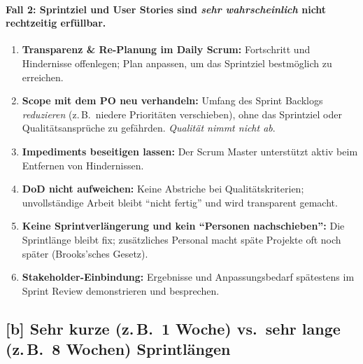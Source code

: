 \documentclass[12pt]{article}
\begin{document}
\paragraph{Fall 2: Sprintziel und User Stories sind \emph{sehr wahrscheinlich} nicht rechtzeitig erfüllbar.}
\begin{enumerate}
  \item \textbf{Transparenz \& Re-Planung im Daily Scrum:} Fortschritt und Hindernisse offenlegen; Plan anpassen, um das Sprintziel bestmöglich zu erreichen.
  \item \textbf{Scope mit dem PO neu verhandeln:} Umfang des Sprint Backlogs \emph{reduzieren} (z.\,B.\ niedere Prioritäten verschieben), ohne das Sprintziel oder Qualitätsansprüche zu gefährden. \emph{Qualität nimmt nicht ab}.
  \item \textbf{Impediments beseitigen lassen:} Der Scrum Master unterstützt aktiv beim Entfernen von Hindernissen.
  \item \textbf{DoD nicht aufweichen:} Keine Abstriche bei Qualitätskriterien; unvollständige Arbeit bleibt \enquote{nicht fertig} und wird transparent gemacht.
  \item \textbf{Keine Sprintverlängerung und kein \enquote{Personen nachschieben}:} Die Sprintlänge bleibt fix; zusätzliches Personal macht späte Projekte oft noch später (Brooks’sches Gesetz).
  \item \textbf{Stakeholder-Einbindung:} Ergebnisse und Anpassungsbedarf spätestens im Sprint Review demonstrieren und besprechen.
\end{enumerate}

\newpage
\subsection*{[b] Sehr kurze (z.\,B.\ 1 Woche) vs.\ sehr lange (z.\,B.\ 8 Wochen) Sprintlängen}
\end{document}

